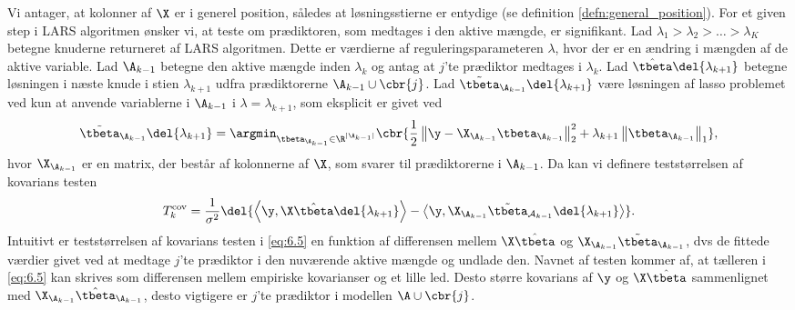 Vi antager, at kolonner af \(\X\) er i generel position, således at løsningsstierne er entydige (se definition \ref{defn:general_position}).
%
For et given step i LARS algoritmen ønsker vi, at teste om prædiktoren, som medtages i den aktive mængde, er signifikant.
Lad \(\lambda_1 > \lambda_2 > \ldots > \lambda_K\) betegne knuderne returneret af LARS algoritmen.
Dette er værdierne af reguleringsparameteren \(\lambda\), hvor der er en ændring i mængden af de aktive variable.
Lad \(\A_{k-1}\) betegne den aktive mængde inden \(\lambda_k\) og antag at \(j\)'te prædiktor medtages i \(\lambda_k\).
Lad \(\hat{\tbeta} \del{\lambda_{k+1}}\) betegne løsningen i næste knude i stien \(\lambda_{k+1}\) udfra prædiktorerne \(\A_{k-1} \cup \cbr{j}\).
Lad \(\tilde{\tbeta}_{\A_{k-1}} \del{\lambda_{k+1}}\) være løsningen af lasso problemet ved kun at anvende variablerne i \(\A_{k-1}\) i \(\lambda = \lambda_{k+1}\), som eksplicit er givet ved 
%
\begin{align*}
\tilde{\tbeta}_{\A_{k-1}} \del{\lambda_{k+1}} = \argmin_{\tbeta_{\A_{k-1}} \in \R^{\vert \A_{k-1} \vert}} \cbr{\frac{1}{2} \left\Vert \y - \X_{\A_{k-1}} \tbeta_{\A_{k-1}} \right\Vert_2^2 + \lambda_{k+1} \left\Vert \tbeta_{\A_{k-1}} \right\Vert_1},
\end{align*}
hvor \(\X_{\A_{k-1}}\) er en matrix, der består af kolonnerne af \(\X\), som svarer til prædiktorerne i \(\A_{k-1}\).
Da kan vi definere teststørrelsen af kovarians testen
\begin{align}
T_k^\text{cov} = \frac{1}{\sigma^2} \del{ \left\langle \y, \X \hat{\tbeta} \del{\lambda_{k+1}} \right\rangle - \left\langle  \y, \X_{\A_{k-1}} \tilde{\tbeta}_{\mathcal{A}_{k-1}} \del{\lambda_{k+1}} \right\rangle}. \label{eq:6.5}
\end{align}
Intuitivt er teststørrelsen af kovarians testen i \eqref{eq:6.5} en funktion af differensen mellem \(\X \hat{\tbeta}\) og \(\X_{\A_{k-1}} \tilde{\tbeta}_{\A_{k-1}}\), dvs de fittede værdier givet ved at medtage \(j\)'te prædiktor i den nuværende aktive mængde og undlade den.
Navnet af testen kommer af, at tælleren i \eqref{eq:6.5} kan skrives som differensen mellem empiriske kovarianser og et lille led.
Desto større kovarians af \(\y\) og \(\X \hat{\tbeta}\) sammenlignet med \(\X_{\A_{k-1}} \hat{\tbeta}_{\A_{k-1}}\), desto vigtigere er \(j\)'te prædiktor i modellen \(\A \cup \cbr{j}\).

